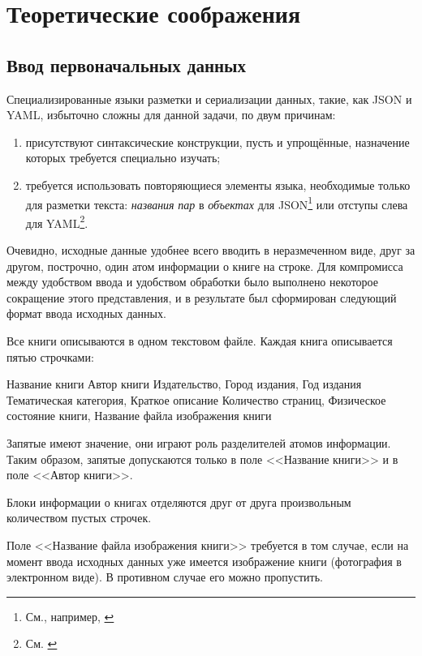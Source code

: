 \documentclass[a4paper,14pt,oneside]{extreport}
\begin{document}
\chapter{Теоретические соображения}

\section{Ввод первоначальных данных}

Специализированные языки разметки и сериализации данных, такие, как JSON и YAML, избыточно сложны для данной задачи, по двум причинам:
\begin{enumerate}
\item присутствуют синтаксические конструкции, пусть и упрощённые, назначение которых требуется специально изучать;
\item требуется использовать повторяющиеся элементы языка, необходимые только для разметки текста: \textit{названия} \textit{пар} в \textit{объектах} для JSON\footnote{См., например, \cite{JSON-spec}} или отступы слева для YAML\footnote{См. \cite{YAML-spec}}.
\end{enumerate} 

Очевидно, исходные данные удобнее всего вводить в неразмеченном виде, друг за другом, построчно, один атом информации о книге на строке. Для компромисса между удобством ввода и удобством обработки было выполнено некоторое сокращение этого представления, и в результате был сформирован следующий формат ввода исходных данных.

\label{rawdata-explained}Все книги описываются в одном текстовом файле. Каждая книга описывается пятью строчками:

\begin{VerbatimCode}
Название книги
Автор книги
Издательство, Город издания, Год издания
Тематическая категория, Краткое описание 
Количество страниц, Физическое состояние книги, Название файла изображения книги
\end{VerbatimCode}

Запятые имеют значение, они играют роль разделителей атомов информации. Таким образом, запятые допускаются только в поле <<Название книги>> и в поле <<Автор книги>>.

Блоки информации о книгах отделяются друг от друга произвольным количеством пустых строчек.

Поле <<Название файла изображения книги>> требуется в том случае, если на момент ввода исходных данных уже имеется изображение книги (фотография в электронном виде). В противном случае его можно пропустить.
\end{document}
